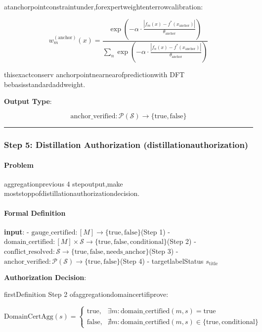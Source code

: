 \documentclass[
  12pt,
]{article}
\begin{document}
atanchorpointconstraintunder,forexpertweightenterrowcalibration:

\[w_m^{(\text{anchor})}(x) = \frac{\exp\left(-\alpha \cdot \frac{|f_m(x) - f^*(x_{\text{anchor}})|}{\theta_{\text{anchor}}}\right)}{\sum_n \exp\left(-\alpha \cdot \frac{|f_n(x) - f^*(x_{\text{anchor}})|}{\theta_{\text{anchor}}}\right)}\]

thisexactconserv anchorpointnearnearofpredictionwith DFT bebasisstandardaddweight.

\textbf{Output Type}:

\[\text{anchor\_verified}: \mathcal{P}(\mathcal{S}) \to \{\text{true}, \text{false}\}\]

\begin{center}\rule{0.5\linewidth}{0.5pt}\end{center}

\subsubsection{Step 5: Distillation Authorization
(distillationauthorization)}\label{step-5-distillation-authorization-ux84b8ux998fux6388ux6743}

\paragraph{Problem}\label{ux95eeux9898-4}

aggregationprevious 4 stepoutput,make moststoppofdistillationauthorizationdecision.

\paragraph{Formal Definition}\label{ux5f62ux5f0fux5316ux5b9aux4e49-4}

\textbf{input}: -
\(\text{gauge\_certified}: [M] \to \{\text{true}, \text{false}\}\)(Step
1) -
\(\text{domain\_certified}: [M] \times \mathcal{S} \to \{\text{true}, \text{false}, \text{conditional}\}\)(Step
2) -
\(\text{conflict\_resolved}: \mathcal{S} \to \{\text{true}, \text{false}, \text{needs\_anchor}\}\)(Step
3) -
\(\text{anchor\_verified}: \mathcal{P}(\mathcal{S}) \to \{\text{true}, \text{false}\}\)(Step
4) - targetlabelStatus \(s_{\text{title}}\)

\textbf{Authorization Decision}:

firstDefinition Step 2 ofaggregationdomaincertifiprove:

\[\text{DomainCertAgg}(s) = \begin{cases}
\text{true}, & \exists m: \text{domain\_certified}(m, s) = \text{true} \\[0.5em]
\text{false}, & \nexists m: \text{domain\_certified}(m, s) \in \{\text{true}, \text{conditional}\}
\end{cases}\]
\end{document}
